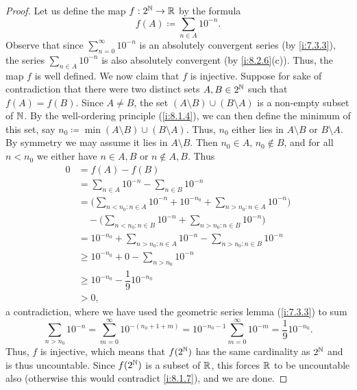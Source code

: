 \begin{proof}
  Let us define the map \(f : 2^{\mathbb{N}} \to \mathbb{R}\) by the formula
  \[
    f(A) \coloneqq \sum_{n \in A} 10^{-n}.
  \]
  Observe that since \(\sum_{n = 0}^\infty 10^{-n}\) is an absolutely convergent series (by \cref{i:7.3.3}), the series \(\sum_{n \in A} 10^{-n}\) is also absolutely convergent (by \cref{i:8.2.6}(c)).
  Thus, the map \(f\)  is well defined.
  We now claim that \(f\) is injective.
  Suppose for sake of contradiction that there were two distinct sets \(A, B \in 2^{\mathbb{N}}\) such that \(f(A) = f(B)\).
  Since \(A \neq B\), the set \((A \setminus B) \cup (B \setminus A)\) is a non-empty subset of \(\mathbb{N}\).
  By the well-ordering principle (\cref{i:8.1.4}), we can then define the minimum of this set, say \(n_0 \coloneqq \min(A \setminus B) \cup (B \setminus A)\).
  Thus, \(n_0\) either lies in \(A \setminus B\) or \(B \setminus A\).
  By symmetry we may assume it lies in \(A \setminus B\).
  Then \(n_0 \in A\), \(n_0 \notin B\), and for all \(n < n_0\) we either have \(n \in A, B\) or \(n \notin A, B\).
  Thus
  \begin{align*}
    0 & = f(A) - f(B)                                                                                 \\
      & = \sum_{n \in A} 10^{-n} - \sum_{n \in B} 10^{-n}                                             \\
      & = \Bigg(\sum_{n < n_0 : n \in A} 10^{-n} + 10^{-n_0} + \sum_{n > n_0 : n \in A} 10^{-n}\Bigg) \\
      & \quad - \Bigg(\sum_{n < n_0 : n \in B} 10^{-n} + \sum_{n > n_0 : n \in B} 10^{-n}\Bigg)       \\
      & = 10^{-n_0} + \sum_{n > n_0 : n \in A} 10^{-n} - \sum_{n > n_0 : n \in B} 10^{-n}             \\
      & \geq 10^{-n_0} + 0 - \sum_{n > n_0} 10^{-n}                                                   \\
      & \geq 10^{-n_0} - \dfrac{1}{9} 10^{-n_0}                                                       \\
      & > 0,
  \end{align*}
  a contradiction, where we have used the geometric series lemma (\cref{i:7.3.3}) to sum
  \[
    \sum_{n > n_0} 10^{-n} = \sum_{m = 0}^\infty 10^{-(n_0 + 1 + m)} = 10^{-n_0 - 1} \sum_{m = 0}^\infty 10^{-m} = \dfrac{1}{9} 10^{-n_0}.
  \]
  Thus, \(f\) is injective, which means that \(f(2^{\mathbb{N}})\) has the same cardinality as \(2^{\mathbb{N}}\) and is thus uncountable.
  Since \(f(2^{\mathbb{N}})\) is a subset of \(\mathbb{R}\), this forces \(\mathbb{R}\) to be uncountable also (otherwise this would contradict \cref{i:8.1.7}), and we are done.
\end{proof}

